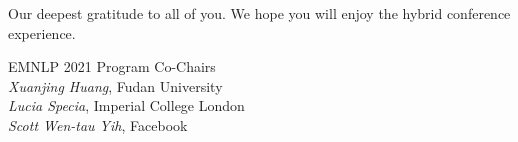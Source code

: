 Our deepest gratitude to all of you. We hope you will enjoy the hybrid conference experience.
\vspace{3em}

\noindent EMNLP 2021 Program Co-Chairs \\

\noindent \textit{Xuanjing Huang}, Fudan University\\
\noindent \textit{Lucia Specia}, Imperial College London\\
\noindent \textit{Scott Wen-tau Yih}, Facebook


